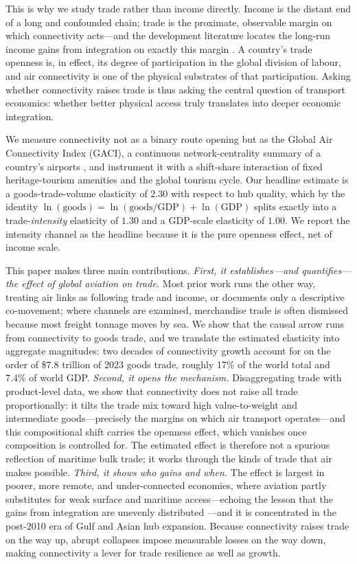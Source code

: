 This is why we study trade rather than income directly. Income is the distant
end of a long and confounded chain; trade is the proximate, observable margin
on which connectivity acts---and the development literature locates the
long-run income gains from integration on exactly this margin
\citep{Frankel_1999,Alcala_2004,Feyrer_2019}. A country's trade openness is, in
effect, its degree of participation in the global division of labour, and air
connectivity is one of the physical substrates of that participation. Asking
whether connectivity raises trade is thus asking the central question of
transport economics: whether better physical access truly translates into
deeper economic integration.

We measure connectivity not as a binary route opening but as the Global Air
Connectivity Index (GACI), a continuous network-centrality summary of a
country's airports \citep{Cheung_2020}, and instrument it with a shift-share
interaction of fixed heritage-tourism amenities and the global tourism cycle.
Our headline estimate is a goods-trade-volume elasticity of $2.30$ with respect
to hub quality, which by the identity
$\ln(\text{goods}) = \ln(\text{goods}/\text{GDP}) + \ln(\text{GDP})$ splits
exactly into a trade-\emph{intensity} elasticity of $1.30$ and a GDP-scale
elasticity of $1.00$. We report the intensity channel as the headline because
it is the pure openness effect, net of income scale.

This paper makes three main contributions. \emph{First, it establishes---and
quantifies---the effect of global aviation on trade.} Most prior work runs the
other way, treating air links as following trade and income, or documents only
a descriptive co-movement; where channels are examined, merchandise trade is
often dismissed because most freight tonnage moves by sea. We show that the
causal arrow runs from connectivity to goods trade, and we translate the
estimated elasticity into aggregate magnitudes: two decades of connectivity
growth account for on the order of \$7.8 trillion of 2023 goods trade, roughly
17\% of the world total and 7.4\% of world GDP. \emph{Second, it opens the
mechanism.} Disaggregating trade with product-level data, we show that
connectivity does not raise all trade proportionally: it tilts the trade mix
toward high value-to-weight and intermediate goods---precisely the margins on
which air transport operates---and this compositional shift carries the
openness effect, which vanishes once composition is controlled for. The
estimated effect is therefore not a spurious reflection of maritime bulk
trade; it works through the kinds of trade that air makes possible.
\emph{Third, it shows who gains and when.} The effect is largest in poorer,
more remote, and under-connected economies, where aviation partly substitutes
for weak surface and maritime access---echoing the lesson that the gains from
integration are unevenly distributed \citep{Pascali_2017}---and it is
concentrated in the post-2010 era of Gulf and Asian hub expansion. Because
connectivity raises trade on the way up, abrupt collapses impose measurable
losses on the way down, making connectivity a lever for trade resilience as
well as growth.

